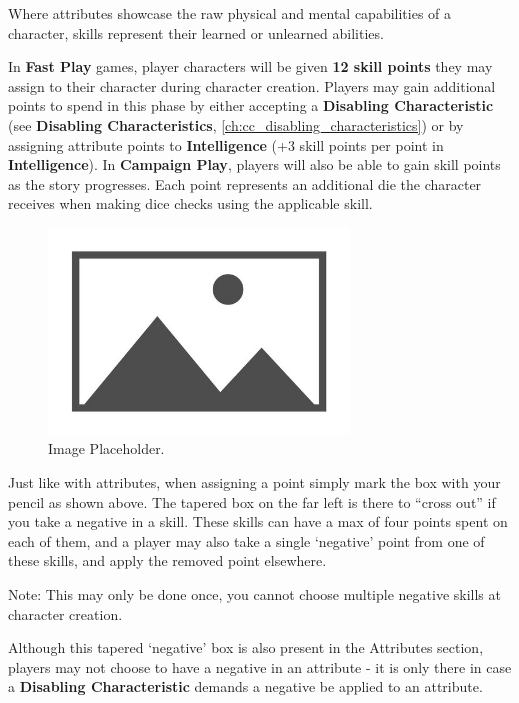Where attributes showcase the raw physical and mental capabilities of a character, skills represent their learned or unlearned abilities.

In \textbf{Fast Play} games, player characters will be given \textbf{12 skill points} they may assign to their character during character creation. Players may gain additional points to spend in this phase by either accepting a \textbf{Disabling Characteristic} (see \textbf{Disabling Characteristics}, \autoref{ch:cc_disabling_characteristics}) or by assigning attribute points to \textbf{Intelligence} (+3 skill points per point in \textbf{Intelligence}). In \textbf{Campaign Play}, players will also be able to gain skill points as the story progresses. Each point represents an additional die the character receives when making dice checks using the applicable skill.

\begin{figure}[H]
    \includegraphics[width=8cm]{images/placeholder}
    \centering
    \caption{Image Placeholder.}
\end{figure}

Just like with attributes, when assigning a point simply mark the box with your pencil as shown above. The tapered box on the far left is there to “cross out” if you take a negative in a skill. These skills can have a max of four points spent on each of them, and a player may also take a single `negative' point from one of these skills, and apply the removed point elsewhere. 

\begin{displayquote}
    Note: This may only be done once, you cannot choose multiple negative skills at character creation.
\end{displayquote}

Although this tapered `negative' box is also present in the Attributes section, players may not choose to have a negative in an attribute - it is only there in case a \textbf{Disabling Characteristic} demands a negative be applied to an attribute.

